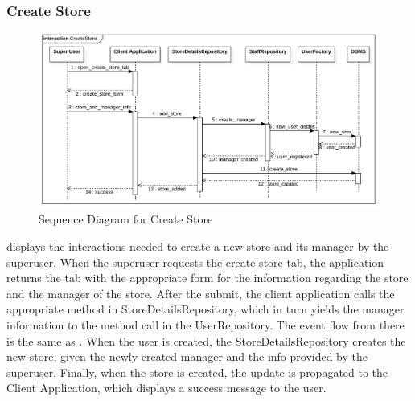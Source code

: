 \subsubsection{Create Store}
\begin{figure}[H]
    \centering
    \includegraphics[height=0.4\textwidth]{Images/SequenceDiagrams/CreateStore.png}
    \caption{Sequence Diagram for Create Store}
    \label{fig:SDCreateStore}
\end{figure}
 displays the interactions needed to create a new store and its manager by the superuser.
When the superuser requests the create store tab, the application returns the tab with the appropriate form for the information regarding the store and the manager of the store.
After the submit, the client application calls the appropriate method in StoreDetailsRepository, which in turn yields the manager information to the method call in the UserRepository.
The event flow from there is the same as .
When the user is created, the StoreDetailsRepository creates the new store, given the newly created manager and the info provided by the superuser.
Finally, when the store is created, the update is propagated to the Client Application, which displays a success message to the user.

